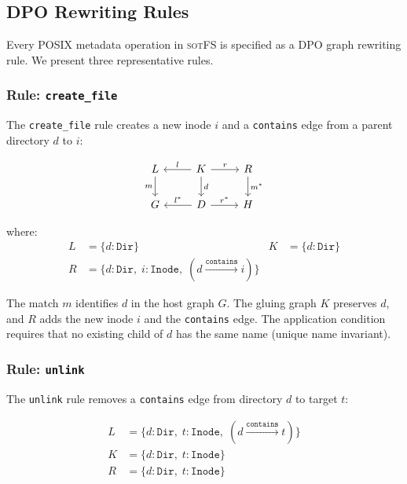 \documentclass[11pt,a4paper]{article}
\theoremstyle{definition}
\theoremstyle{remark}
\newcommand{\sotfs}{\textsc{sotFS}}
\begin{document}
\subsection{DPO Rewriting Rules}
\label{sec:sotfs-dpo}

Every POSIX metadata operation in \sotfs{} is specified as a DPO
graph rewriting rule. We present three representative rules.

\subsubsection{Rule: \texttt{create\_file}}

The \texttt{create\_file} rule creates a new inode $i$ and a
\texttt{contains} edge from a parent directory $d$ to $i$:

\begin{equation}
\label{eq:create-file}
\begin{tikzcd}[column sep=2.5em]
L \arrow[d, "m"'] & K \arrow[l, "l"'] \arrow[r, "r"]
  \arrow[d, "d"] & R \arrow[d, "m^*"] \\
G & D \arrow[l, "l^*"'] \arrow[r, "r^*"] & H
\end{tikzcd}
\end{equation}

\noindent
where:
\begin{align*}
L &= \{d : \texttt{Dir}\} &
K &= \{d : \texttt{Dir}\} \\
R &= \{d : \texttt{Dir},\; i : \texttt{Inode},\;
       (d \xrightarrow{\texttt{contains}} i)\}
\end{align*}

The match $m$ identifies $d$ in the host graph $G$. The gluing graph
$K$ preserves $d$, and $R$ adds the new inode $i$ and the
\texttt{contains} edge. The application condition requires that no
existing child of $d$ has the same name (unique name invariant).

\subsubsection{Rule: \texttt{unlink}}

The \texttt{unlink} rule removes a \texttt{contains} edge from
directory $d$ to target $t$:

\begin{align*}
L &= \{d : \texttt{Dir},\; t : \texttt{Inode},\;
       (d \xrightarrow{\texttt{contains}} t)\} \\
K &= \{d : \texttt{Dir},\; t : \texttt{Inode}\} \\
R &= \{d : \texttt{Dir},\; t : \texttt{Inode}\}
\end{align*}
\end{document}
